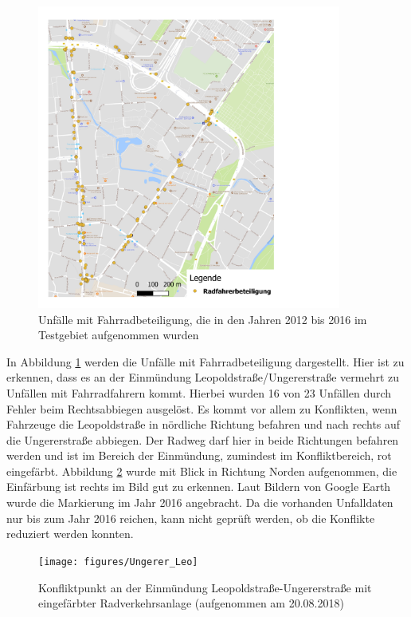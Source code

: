 \begin{savenotes}
	\begin{figure}[H]
		\centering
		\includegraphics[width=10cm,height=10cm]{figures/map_radfahrer}
		\caption[Unfälle mit Fahrradbeteiligung, die in den Jahren 2012 bis 2016 im Testgebiet aufgenommen wurden]{Unfälle mit Fahrradbeteiligung, die in den Jahren 2012 bis 2016 im Testgebiet aufgenommen wurden}\label{fig:map_radfahrer}
	\end{figure}
\end{savenotes}

In Abbildung \ref{fig:map_radfahrer} werden die Unfälle mit Fahrradbeteiligung dargestellt. Hier ist zu erkennen, dass es an der Einmündung Leopoldstraße/Ungererstraße vermehrt zu Unfällen mit Fahrradfahrern kommt. Hierbei wurden 16 von 23 Unfällen durch Fehler beim Rechtsabbiegen ausgelöst. Es kommt vor allem zu Konflikten, wenn Fahrzeuge die Leopoldstraße in nördliche Richtung befahren und nach rechts auf die Ungererstraße abbiegen. Der Radweg darf hier in beide Richtungen befahren werden und ist im Bereich der Einmündung, zumindest im Konfliktbereich, rot eingefärbt. Abbildung \ref{fig:Konflikt_Ungerer_Leo} wurde mit Blick in Richtung Norden aufgenommen, die Einfärbung ist rechts im Bild gut zu erkennen. Laut Bildern von Google Earth wurde die Markierung im Jahr 2016 angebracht. Da die vorhanden Unfalldaten nur bis zum Jahr 2016 reichen, kann nicht geprüft werden, ob die Konflikte reduziert werden konnten.

\begin{savenotes}
	\begin{figure}[H]
		\centering
		\texttt{[image: figures/Ungerer\_Leo]}
		\caption[Konfliktpunkt an der Einmündung Leopoldstraße-Ungererstraße mit eingefärbter Radverkehrsanlage]{Konfliktpunkt an der Einmündung Leopoldstraße-Ungererstraße mit eingefärbter Radverkehrsanlage (aufgenommen am 20.08.2018)}\label{fig:Konflikt_Ungerer_Leo}
	\end{figure}
\end{savenotes}

